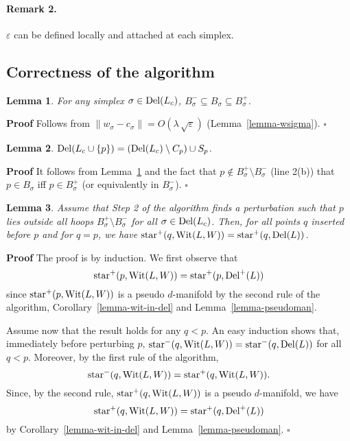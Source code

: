 \documentclass[11pt,a4paper]{article}
\newtheorem{lemma}{Lemma}
\newenvironment{proof}
        {\noindent \textbf{Proof} \hspace{0.3mm}}
        {\hspace{0.3mm}$\square$  \smallskip}
\newcommand{\e}{\varepsilon}
\newcommand{\str}{{\rm star}}
\newcommand{\del}{{\rm Del}}
\newcommand{\wit}{{\rm Wit}}
\begin{document}
\paragraph{Remark 2.} $\e$ can be defined locally and attached at each simplex.


\subsection*{Correctness of the algorithm}

\begin{lemma}
\label{lemma-BBB}
For any simplex $\sigma\in \del(L_c)$, $B_{\sigma}^- \subseteq
B_{\sigma} \subseteq B_{\sigma}^+$.
\end{lemma}

\begin{proof}
Follows from  $\| w_{\sigma}-c_{\sigma}\| =O(\lambda\, \sqrt{\e})$ (Lemma~\ref{lemma-wsigma}).
\end{proof}


\begin{lemma}
$\del (L_c \cup \{ p\})= \left( \del(L_c)\setminus C_p\right)  \cup S_p$.
\end{lemma}

\begin{proof}
It follows from Lemma~\ref{lemma-BBB} and the fact that $p\not\in B_{\sigma}^+\setminus B_{\sigma}^-$ (line
2(b)) that $p\in B_{\sigma}$ iff $p\in B_{\sigma}^+$ (or equivalently
in $B_{\sigma}^-$).
\end{proof}

\begin{lemma}
Assume that Step 2 of the algorithm finds a perturbation such that $p$
lies outside all hoops $B_{\sigma}^+ \setminus B_{\sigma}^-$ for all
$\sigma\in \del (L_c)$. Then, for all points $q$ inserted before $p$ and
for $q=p$, we have $\str ^+ (q, \wit (L,W))= \str^+ (q, \del (L))$.
\end{lemma}

\begin{proof}
The proof is by induction. We first observe that 
$$\str^+ (p, \wit (L,W)) = \str^+ (p,\del^+ (L))$$
since $\str^+ (p, \wit (L,W))$ is a pseudo $d$-manifold by the second rule
of the algorithm, Corollary~\ref{lemma-wit-in-del}  and Lemma~\ref{lemma-pseudoman}.

Assume now that the result holds for any
$q<p$. An easy induction shows that,  immediately before perturbing $p$, 
$\str^- (q, \wit (L,W))= \str^-  (q, \del (L))$ for all $q<p$. Moreover,
 by the first rule of the algorithm, 
$$\str^- (q, \wit
(L,W))=\str^+ (q, \wit (L,W)).$$
Since, by the second rule, $\str^+ (q, \wit (L,W))$ is a
pseudo $d$-manifold, we have
$$\str^+ (q, \wit (L,W)) = \str^+ (q,\del^+ (L))$$
by Corollary~\ref{lemma-wit-in-del}  and Lemma~\ref{lemma-pseudoman}.
\end{proof}
\end{document}
